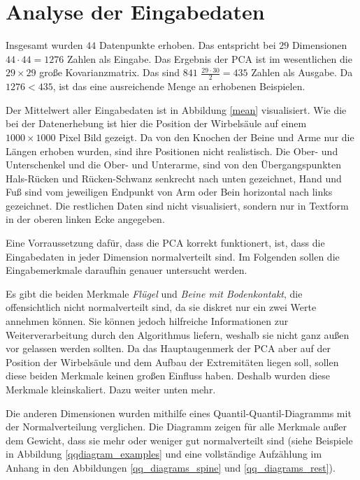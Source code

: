  \section{Analyse der Eingabedaten}
 \label{pca_input_analysis}
 
  Insgesamt wurden $44$ Datenpunkte erhoben. Das entspricht bei $29$ Dimensionen $44 \cdot 44 = 1276$ Zahlen als Eingabe. Das Ergebnis der PCA ist im wesentlichen die $29 \times 29$ große Kovarianzmatrix. Das sind $841$ \bzw $\frac{29 \cdot 30}{2} = 435$ Zahlen als Ausgabe. Da $1276 < 435$, ist das eine ausreichende Menge an erhobenen Beispielen. 
 
 Der Mittelwert aller Eingabedaten ist in Abbildung \ref{mean} visualisiert.
 Wie die bei der Datenerhebung ist hier die Position der Wirbelsäule auf einem $1000 \times 1000$ Pixel Bild gezeigt. Da von den Knochen der Beine und Arme nur die Längen erhoben wurden, sind ihre Positionen nicht realistisch. Die Ober- und Unterschenkel und die Ober- und Unterarme, sind von den Übergangspunkten Hals-Rücken und Rücken-Schwanz senkrecht nach unten gezeichnet, Hand und Fuß sind vom jeweiligen Endpunkt von Arm oder Bein horizontal nach links gezeichnet. Die restlichen Daten sind nicht visualisiert, sondern nur in Textform in der oberen linken Ecke angegeben.
 
 Eine Vorraussetzung dafür, dass die PCA korrekt funktionert, ist, dass die Eingabedaten in jeder Dimension normalverteilt sind. Im Folgenden sollen die Eingabemerkmale daraufhin genauer untersucht werden.
 
 Es gibt die beiden Merkmale \emph{Flügel} und \emph{Beine mit Bodenkontakt}, die offensichtlich nicht normalverteilt sind, da sie diskret nur ein \bzw zwei Werte annehmen können. Sie können jedoch hilfreiche Informationen zur Weiterverarbeitung durch den Algorithmus liefern, weshalb sie nicht ganz außen vor gelassen werden sollten. Da das Hauptaugenmerk der PCA aber auf der Position der Wirbelsäule und dem Aufbau der Extremitäten liegen soll, sollen diese beiden Merkmale keinen großen Einfluss haben. Deshalb wurden diese Merkmale kleinskaliert. Dazu weiter unten mehr.
 
 Die anderen Dimensionen wurden mithilfe eines Quantil-Quantil-Diagramms mit der Normalverteilung verglichen. 
 Die Diagramm zeigen für alle Merkmale außer dem Gewicht, dass sie mehr oder weniger gut normalverteilt sind (siehe Beispiele in Abbildung \ref{qqdiagram_examples} und eine vollständige Aufzählung im Anhang in den Abbildungen \ref{qq_diagrams_spine} und \ref{qq_diagrams_rest}).
 
